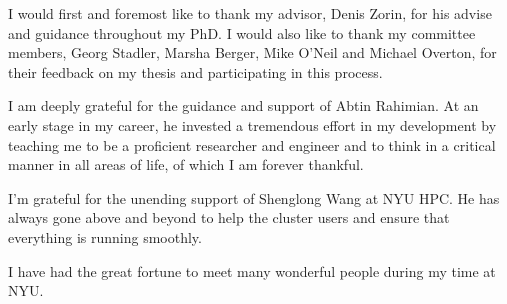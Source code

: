 I would first and foremost like to thank my advisor, Denis Zorin, for his advise and guidance throughout my PhD. I would also like to thank my committee members, Georg Stadler, Marsha Berger, Mike O'Neil and Michael Overton, for their feedback on my thesis and participating in this process.

I am deeply grateful for the guidance and support of Abtin Rahimian.
At an early stage in my career, he invested a tremendous effort in my development by teaching me to be a proficient researcher and engineer and to think in a critical manner in all areas of life, of which I am forever thankful.

I'm grateful for the unending support of Shenglong Wang at NYU HPC. 
He has always gone above and beyond to help the cluster users and ensure that everything is running smoothly.

I have had the great fortune to meet many wonderful people during my time at NYU.


